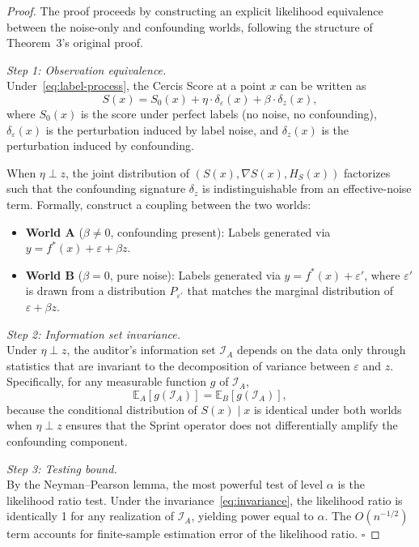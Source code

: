 \documentclass[12pt,a4paper]{article}
\newcommand{\E}{\mathbb{E}}
\newcommand{\cI}{\mathcal{I}}
\begin{document}
\begin{proof}
The proof proceeds by constructing an explicit likelihood equivalence between
the noise-only and confounding worlds, following the structure of Theorem~3's
original proof.

\textit{Step 1: Observation equivalence.}\\
Under~\eqref{eq:label-process}, the Cercis Score at a point $x$ can be written
as
\begin{equation}\label{eq:s-decomp}
    S(x) = S_0(x) + \eta \cdot \delta_\varepsilon(x) + \beta \cdot
    \delta_z(x),
\end{equation}
where $S_0(x)$ is the score under perfect labels (no noise, no confounding),
$\delta_\varepsilon(x)$ is the perturbation induced by label noise, and
$\delta_z(x)$ is the perturbation induced by confounding.

When $\eta \perp z$, the joint distribution of
$(S(x), \nabla S(x), H_S(x))$ factorizes such that the confounding signature
$\delta_z$ is indistinguishable from an effective-noise term.  Formally,
construct a coupling between the two worlds:
\begin{itemize}
    \item \textbf{World A} ($\beta \neq 0$, confounding present): Labels
          generated via $y = f^*(x) + \varepsilon + \beta z$.
    \item \textbf{World B} ($\beta = 0$, pure noise): Labels generated via
          $y = f^*(x) + \varepsilon'$, where $\varepsilon'$ is drawn from a
          distribution $P_{\varepsilon'}$ that matches the marginal distribution
          of $\varepsilon + \beta z$.
\end{itemize}

\textit{Step 2: Information set invariance.}\\
Under $\eta \perp z$, the auditor's information set $\cI_A$ depends on the data
only through statistics that are invariant to the decomposition of variance
between $\varepsilon$ and $z$.  Specifically, for any measurable function
$g$ of $\cI_A$,
\begin{equation}\label{eq:invariance}
    \E_A[g(\cI_A)] = \E_B[g(\cI_A)],
\end{equation}
because the conditional distribution of $S(x) \mid x$ is identical under both
worlds when $\eta \perp z$ ensures that the Sprint operator does not
differentially amplify the confounding component.

\textit{Step 3: Testing bound.}\\
By the Neyman--Pearson lemma, the most powerful test of level $\alpha$ is the
likelihood ratio test.  Under the invariance~\eqref{eq:invariance}, the
likelihood ratio is identically 1 for any realization of $\cI_A$, yielding
power equal to $\alpha$.  The $O(n^{-1/2})$ term accounts for finite-sample
estimation error of the likelihood ratio.  $\square$
\end{proof}
\end{document}
